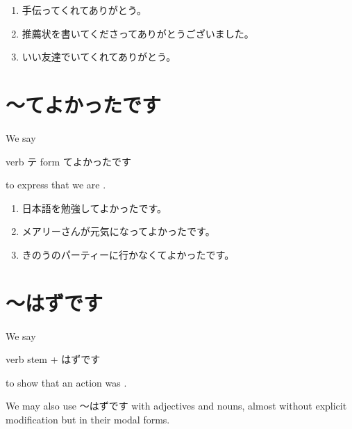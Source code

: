 \documentclass[notoc,notitlepage]{tufte-book}
\begin{document}
\begin{eg}
  \begin{enumerate}
    \item 手伝ってくれてありがとう。
    \item 推薦状を書いてくださってありがとうございました。
    \item いい友達でいてくれてありがとう。
  \end{enumerate}
\end{eg}


\section{〜てよかったです}%
\label{sec:_teyokatsutadesu}

\begin{defn}[〜てよかった]\label{defn:_teyokatsuta}
  We say
  \begin{center}
    verb テ form てよかったです
  \end{center}
  to express that we are .
\end{defn}

\begin{eg}
  \begin{enumerate}
    \item 日本語を勉強してよかったです。
    \item メアリーさんが元気になってよかったです。
    \item きのうのパーティーに行かなくてよかったです。
  \end{enumerate}
\end{eg}


\section{〜はずです}%
\label{sec:_hazudesu}

\begin{defn}[〜はずです]\label{defn:_hazudesu}
  We say
  \begin{center}
    verb stem + はずです
  \end{center}
  to show that an action was .

  We may also use 〜はずです with adjectives and nouns,
  almost without explicit modification but in their modal forms.
\end{defn}
\end{document}
